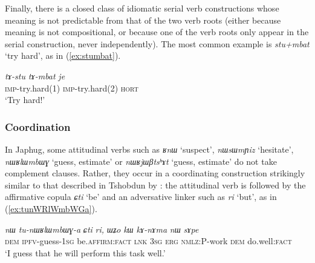 \documentclass[oneside,a4paper,11pt]{article}
\newcommand{\ipa}[1]{\textit{\phon#1}}
\newcommand{\jpg}[2]{\ipa{#1} `#2'}
\newcommand{\refb}[1]{(\ref{#1})}
\begin{document}
Finally, there is a closed class of idiomatic serial verb constructions whose meaning is not predictable from that of the two verb roots (either because meaning is not compositional, or because one of the verb roots only appear in the serial construction, never independently). The most common example is \jpg{stu+mbat}{try hard}, as in \refb{ex:stumbat}.

\begin{exe}
\ex  \label{ex:stumbat}
\gll \ipa{tɤ-stu} \ipa{tɤ-mbat} \ipa{je} \\
\textsc{imp}-try.hard(1) \textsc{imp}-try.hard(2) \textsc{hort} \\
\glt `Try hard!'
\end{exe}




\subsubsection{Coordination} \label{sec:coordination}
In Japhug, some attitudinal verbs such as \jpg{ʁnɯ}{suspect}, \jpg{nɯsɯmɲiz}{hesitate}, \jpg{nɯʁlɯmbɯɣ}{guess, estimate} or \jpg{nɯʁjɯβtsʰɤt}{guess, estimate} do not take complement clauses. Rather, they occur in a coordinating construction strikingly similar to that described in Tshobdun  by \citet[487-8]{sun12complementation}: the attitudinal verb is followed by the affirmative copula \jpg{ɕti}{be} and an adversative linker such as \jpg{ri}{but}, as in (\ref{ex:tunWRlWmbWGa}).

\begin{exe}
\ex \label{ex:tunWRlWmbWGa}
\gll \ipa{nɯ} 	\ipa{tu-nɯʁlɯmbɯɣ-a} 	\ipa{ɕti} 	\ipa{ri,} 	\ipa{ɯʑo} 	\ipa{kɯ} 	\ipa{kɤ-nɤma} 	\ipa{nɯ} 	\ipa{sɤpe} \\
\textsc{dem} \textsc{ipfv}-guess-\textsc{1sg} be.\textsc{affirm:fact} \textsc{lnk} \textsc{3sg} \textsc{erg} \textsc{nmlz:P}-work \textsc{dem} do.well:\textsc{fact} \\
\glt `I guess that he will perform this task well.'
\end{exe}
\end{document}
